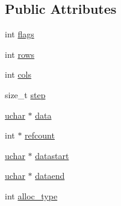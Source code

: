 \subsection*{Public Attributes}
\begin{DoxyCompactItemize}
\item 
int \hyperlink{classcv_1_1gpu_1_1CudaMem_a312c10159c12ed29880b32bf32fedebc}{flags}
\item 
int \hyperlink{classcv_1_1gpu_1_1CudaMem_a7a9d3e9cac593f025c71e86a4e855f15}{rows}
\item 
int \hyperlink{classcv_1_1gpu_1_1CudaMem_ac0ebd6815d262974d6fb1b6fa79fe360}{cols}
\item 
size\-\_\-t \hyperlink{classcv_1_1gpu_1_1CudaMem_aeac8b2b4d5cc098a8045902083df1ae2}{step}
\item 
\hyperlink{core_2types__c_8h_a65f85814a8290f9797005d3b28e7e5fc}{uchar} $\ast$ \hyperlink{classcv_1_1gpu_1_1CudaMem_aa354a703e72b23a67c266e53b7a55f26}{data}
\item 
int $\ast$ \hyperlink{classcv_1_1gpu_1_1CudaMem_a6ade5baf301830405c01394c322087d2}{refcount}
\item 
\hyperlink{core_2types__c_8h_a65f85814a8290f9797005d3b28e7e5fc}{uchar} $\ast$ \hyperlink{classcv_1_1gpu_1_1CudaMem_a95693b049c55edf60c57733b80387ea9}{datastart}
\item 
\hyperlink{core_2types__c_8h_a65f85814a8290f9797005d3b28e7e5fc}{uchar} $\ast$ \hyperlink{classcv_1_1gpu_1_1CudaMem_a9daa5a5b4a9c028444f3b45bde90ad63}{dataend}
\item 
int \hyperlink{classcv_1_1gpu_1_1CudaMem_a253dcb37318ea0b109dca064678b88e0}{alloc\-\_\-type}
\end{DoxyCompactItemize}


